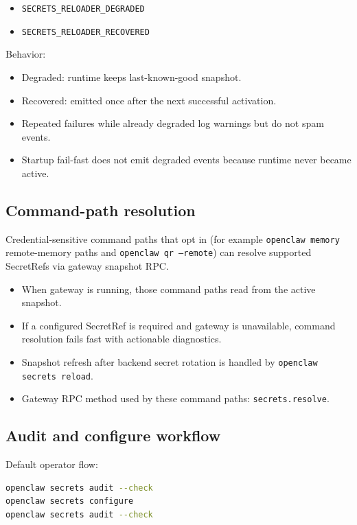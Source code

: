 \begin{itemize}
  \item \texttt{SECRETS\_RELOADER\_DEGRADED}
  \item \texttt{SECRETS\_RELOADER\_RECOVERED}
\end{itemize}


Behavior:

\begin{itemize}
  \item Degraded: runtime keeps last-known-good snapshot.
  \item Recovered: emitted once after the next successful activation.
  \item Repeated failures while already degraded log warnings but do not spam events.
  \item Startup fail-fast does not emit degraded events because runtime never became active.
\end{itemize}


\subsection{Command-path resolution}


Credential-sensitive command paths that opt in (for example \texttt{openclaw memory} remote-memory paths and \texttt{openclaw qr --remote}) can resolve supported SecretRefs via gateway snapshot RPC.

\begin{itemize}
  \item When gateway is running, those command paths read from the active snapshot.
  \item If a configured SecretRef is required and gateway is unavailable, command resolution fails fast with actionable diagnostics.
  \item Snapshot refresh after backend secret rotation is handled by \texttt{openclaw secrets reload}.
  \item Gateway RPC method used by these command paths: \texttt{secrets.resolve}.
\end{itemize}


\subsection{Audit and configure workflow}


Default operator flow:

\begin{lstlisting}[language=bash]
openclaw secrets audit --check
openclaw secrets configure
openclaw secrets audit --check
\end{lstlisting}


